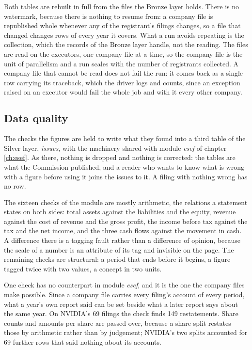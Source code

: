 Both tables are rebuilt in full from the files the Bronze layer holds. There is no watermark, because there is nothing to resume from: a company file is republished whole whenever any of the registrant's filings changes, so a file that changed changes rows of every year it covers. What a run avoids repeating is the collection, which the records of the Bronze layer handle, not the reading. The files are read on the executors, one company file at a time, so the company file is the unit of parallelism and a run scales with the number of registrants collected. A company file that cannot be read does not fail the run: it comes back as a single row carrying its traceback, which the driver logs and counts, since an exception raised on an executor would fail the whole job and with it every other company.

\subsection{Data quality}

The checks the figures are held to write what they found into a third table of the Silver layer, \emph{issues}, with the machinery shared with module \emph{esef} of chapter \ref{ch:esef}. As there, nothing is dropped and nothing is corrected: the tables are what the Commission published, and a reader who wants to know what is wrong with a figure before using it joins the issues to it. A filing with nothing wrong has no row.

The sixteen checks of the module are mostly arithmetic, the relations a statement states on both sides: total assets against the liabilities and the equity, revenue against the cost of revenue and the gross profit, the income before tax against the tax and the net income, and the three cash flows against the movement in cash. A difference there is a tagging fault rather than a difference of opinion, because the scale of a number is an attribute of its tag and invisible on the page. The remaining checks are structural: a period that ends before it begins, a figure tagged twice with two values, a concept in two units.

One check has no counterpart in module \emph{esef}, and it is the one the company files make possible. Since a company file carries every filing's account of every period, what a year's own report said can be set beside what a later report says about the same year. On NVIDIA's 69 filings the check finds 149 restatements. Share counts and amounts per share are passed over, because a share split restates those by arithmetic rather than by judgement; NVIDIA's two splits accounted for 69 further rows that said nothing about its accounts.

